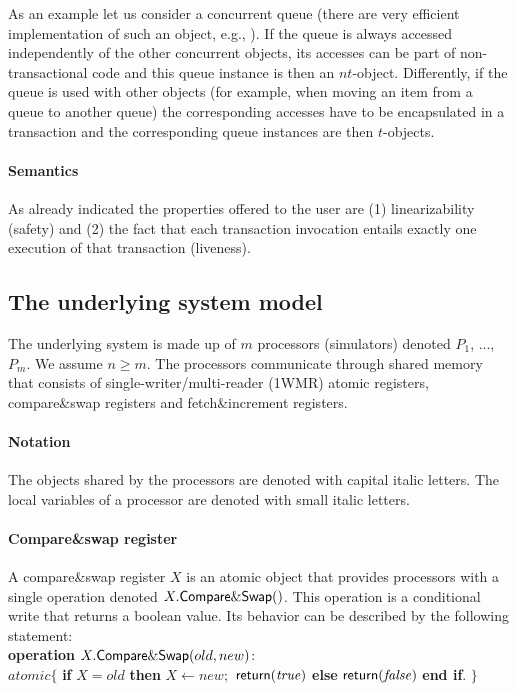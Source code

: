 As an example let us consider a concurrent queue (there are very 
efficient implementation of such an object, e.g., \cite{MS96}). 
If the queue is always  accessed independently of the other concurrent 
objects,  its accesses can be part of non-transactional code and 
this queue instance is  then an $nt$-object. 
Differently,  if the queue is used with other objects
(for example, when  moving an item from a queue to another queue) the 
corresponding accesses  have to  be encapsulated in  a transaction  and the
corresponding queue instances are then  $t$-objects. 

\paragraph{Semantics}
As already indicated the properties offered to the user are
(1)  linearizability  (safety) and 
(2) the fact that each transaction invocation entails  exactly one
execution of that transaction (liveness). 



\subsection{The underlying system model}
The underlying system is made up of $m$ processors (simulators) 
denoted $P_1$, ..., $P_m$.  We assume $n \geq m$.
The processors communicate through  shared memory that consists  of 
single-writer/multi-reader (1WMR) atomic registers, 
compare\&swap registers and fetch\&increment registers. 

\paragraph{Notation} 
The  objects shared by the processors are denoted with capital italic letters.
The local  variables of a processor are denoted with small italic letters.

\paragraph{Compare\&swap register}
A compare\&swap register  $X$ is an atomic object that provides 
processors with  a single  operation
denoted  $X.{\sf Compare\&Swap}()$. This operation is a conditional 
write that returns a boolean value. Its behavior can be described by
 the following statement:
\\
{\bf operation}  $X.{\sf Compare\&Swap}(old,new)$:\\
\hspace*{1cm} $atomic\{$
{\bf if}  $X=old$ 
{\bf then} $X\leftarrow new;$  ${\sf return} (\mathit{true})$
{\bf else} ${\sf return} (\mathit{false})$ 
{\bf end if}. 
$\}$



